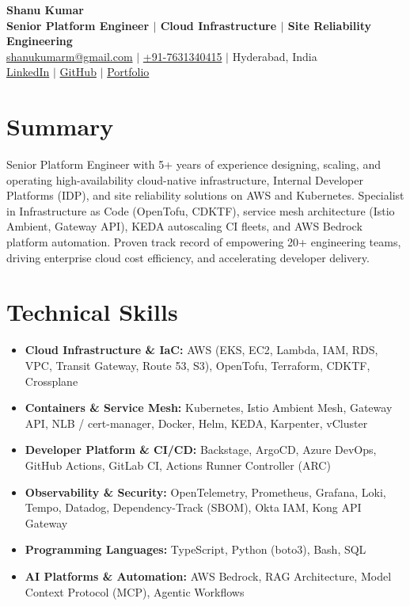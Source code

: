 \documentclass[11pt,a4paper]{article}
\newcommand{\sectionItemBegin}{
  \begin{itemize}[left=1.2em, label=\small$\bullet$, itemsep=1pt, parsep=0pt, topsep=0.8pt]
}
\newcommand{\sectionItemEnd}{\end{itemize}}
\begin{document}
\begin{center}
  {\Huge \textbf{Shanu Kumar}}\\
  \vspace{1pt}
  \textbf{\color{SectionBlue}Senior Platform Engineer $|$ Cloud Infrastructure $|$ Site Reliability Engineering} \\
  \vspace{1.5pt}
  \href{mailto:shanukumarm@gmail.com}{shanukumarm@gmail.com} $|$
  \href{tel:+917631340415}{+91-7631340415} $|$
  Hyderabad, India \\
  \vspace{1.5pt}
  \href{https://linkedin.com/in/shanukumarm}{LinkedIn} $|$
  \href{https://github.com/shanukumarm}{GitHub} $|$
  \href{https://shanukumarm.github.io/portfolio/}{Portfolio}
\end{center}

\section{Summary}
Senior Platform Engineer with 5+ years of experience designing, scaling, and operating high-availability cloud-native infrastructure, Internal Developer Platforms (IDP), and site reliability solutions on AWS and Kubernetes. Specialist in Infrastructure as Code (OpenTofu, CDKTF), service mesh architecture (Istio Ambient, Gateway API), KEDA autoscaling CI fleets, and AWS Bedrock platform automation. Proven track record of empowering 20+ engineering teams, driving enterprise cloud cost efficiency, and accelerating developer delivery.

\section{Technical Skills}
  \sectionItemBegin{}
    \item \textbf{Cloud Infrastructure \& IaC:} AWS (EKS, EC2, Lambda, IAM, RDS, VPC, Transit Gateway, Route 53, S3), OpenTofu, Terraform, CDKTF, Crossplane
    \item \textbf{Containers \& Service Mesh:} Kubernetes, Istio Ambient Mesh, Gateway API, NLB / cert-manager, Docker, Helm, KEDA, Karpenter, vCluster
    \item \textbf{Developer Platform \& CI/CD:} Backstage, ArgoCD, Azure DevOps, GitHub Actions, GitLab CI, Actions Runner Controller (ARC)
    \item \textbf{Observability \& Security:} OpenTelemetry, Prometheus, Grafana, Loki, Tempo, Datadog, Dependency-Track (SBOM), Okta IAM, Kong API Gateway
    \item \textbf{Programming Languages:} TypeScript, Python (boto3), Bash, SQL
    \item \textbf{AI Platforms \& Automation:} AWS Bedrock, RAG Architecture, Model Context Protocol (MCP), Agentic Workflows
  \sectionItemEnd{}
\end{document}
